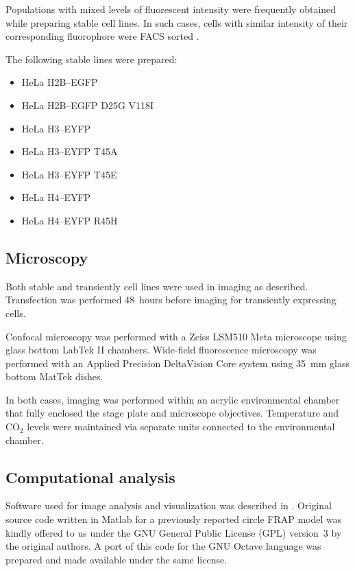     Populations with mixed levels of fluorescent intensity were frequently
    obtained while preparing stable cell lines. In such cases, cells with
    similar intensity of their corresponding fluorophore were FACS
    sorted .

    The following stable lines were prepared:

    \begin{itemize}
      \item HeLa H2B--EGFP
      \item HeLa H2B--EGFP D25G V118I
      \item HeLa H3--EYFP
      \item HeLa H3--EYFP T45A
      \item HeLa H3--EYFP T45E
      \item HeLa H4--EYFP
      \item HeLa H4--EYFP R45H
    \end{itemize}

  \subsection{Microscopy}

    Both stable and transiently cell lines were used in imaging as described.
    Transfection was performed 48~hours before imaging for transiently
    expressing cells.

    Confocal microscopy was performed with a Zeiss LSM510 Meta microscope
    using glass bottom LabTek II chambers. Wide-field fluorescence microscopy
    was performed with an Applied Precision DeltaVision Core system
    using \SI{35}{\mm} glass bottom MatTek dishes.

    In both cases, imaging was performed within an acrylic environmental
    chamber that fully enclosed the stage plate and microscope objectives.
    Temperature and CO$_2$ levels were maintained via separate units connected
    to the environmental chamber.

  \subsection{Computational analysis}

    Software used for image analysis and visualization was described in
    .
    Original source code written in Matlab for a previously
    reported circle FRAP model \citep{mcnally-frap-code} was kindly offered
    to us under the GNU General Public License (GPL) version~3 by the
    original authors. A port of this code for the GNU Octave language was
    prepared and made available under the same license.
